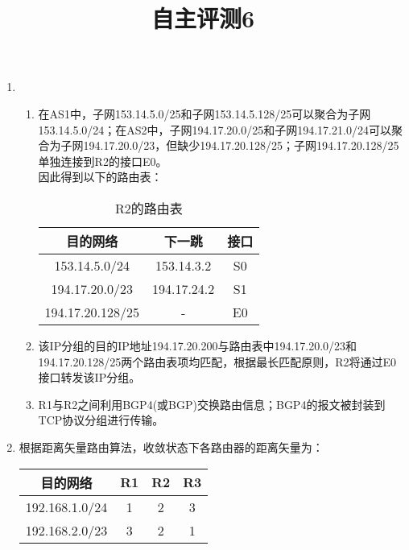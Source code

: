 \documentclass[11pt]{article}
\title{自主评测6}
\date{}
\author{}
\begin{document}
\maketitle

\begin{enumerate}
    \renewcommand{\labelenumii}{(\arabic{enumii})}
    \item
    \begin{enumerate}
        \item 在AS1中，子网153.14.5.0/25和子网153.14.5.128/25可以聚合为子网153.14.5.0/24；在AS2中，子网194.17.20.0/25和子网194.17.21.0/24可以聚合为子网194.17.20.0/23，但缺少194.17.20.128/25；子网194.17.20.128/25单独连接到R2的接口E0。 \\ 因此得到以下的路由表：
        \begin{table}[htbp]
            \centering
            \begin{tabular}{|c|c|c|} 
                \hline
                目的网络 & 下一跳 & 接口 \\ 
                \hline
                153.14.5.0/24 & 153.14.3.2 & S0 \\ 
                \hline
                194.17.20.0/23 & 194.17.24.2 & S1 \\ 
                \hline
                194.17.20.128/25 & - & E0 \\ 
                \hline
            \end{tabular}
            \label{table-1}
            \caption{R2的路由表}
        \end{table}
        \item 该IP分组的目的IP地址194.17.20.200与路由表中194.17.20.0/23和194.17.20.128/25两个路由表项均匹配，根据最长匹配原则，R2将通过E0接口转发该IP分组。
        \item R1与R2之间利用BGP4(或BGP)交换路由信息；BGP4的报文被封装到TCP协议分组进行传输。
    \end{enumerate}

    \item 根据距离矢量路由算法，收敛状态下各路由器的距离矢量为：
    \begin{table}[htbp]
        \centering
        \begin{tabular}{|c|c|c|c|} 
            \hline
            目的网络 & R1 & R2 & R3 \\ 
            \hline
            192.168.1.0/24 & 1 & 2 & 3 \\ 
            \hline
            192.168.2.0/23 & 3 & 2 & 1 \\ 
            \hline
        \end{tabular}
        \label{table-2}
    \end{table}


\end{enumerate}
\end{document}

